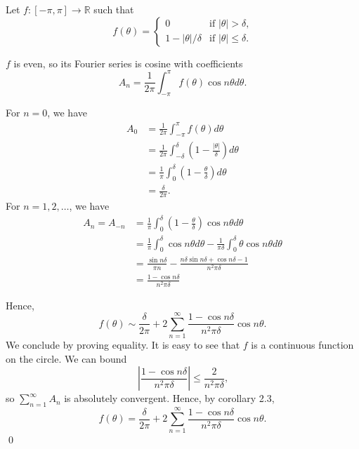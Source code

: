 \documentclass[oneside]{article}
\newcommand\abs[1]{\left|#1\right|}
\newcommand\bbR{\mathbb{R}}
\begin{document}
Let $f : [-\pi, \pi] \to \bbR$ such that \[
  f(\theta) = \begin{cases}
    0 & \text{if }\abs{\theta} > \delta \text{,} \\
    1 - \abs{\theta}/\delta & \text{if }\abs{\theta} \leq \delta \text{.}
  \end{cases}
\]

$f$ is even, so its Fourier series is cosine with coefficients\[
  A_n = \frac{1}{2\pi}\int_{-\pi}^\pi f(\theta)\cos n\theta d\theta \text{.}
\]

For $n = 0$, we have \begin{align*}
  A_0
  &= \frac{1}{2\pi}\int_{-\pi}^\pi f(\theta) d\theta \\
  &= \frac{1}{2\pi}\int_{-\delta}^\delta
  \left(1 - \frac{\abs{\theta}}{\delta}\right) d\theta \\
  &= \frac{1}{\pi}\int_0^\delta
  \left(1 - \frac{\theta}{\delta}\right) d\theta \\
  &= \frac{\delta}{2\pi} \text{.}
\end{align*} For $n = 1, 2, \dots$, we have\begin{align*}
  A_{n} = A_{-n} &= \frac{1}{\pi}\int_0^\delta
  \left(1 - \frac{\theta}{\delta}\right) \cos n\theta d\theta \\
  &= \frac{1}{\pi}\int_0^\delta \cos n\theta d\theta
   - \frac{1}{\pi\delta}\int_0^\delta \theta \cos n\theta d\theta \\
  &= \frac{\sin n\delta}{\pi n}
   - \frac{n\delta\sin n\delta + \cos n\delta - 1}{n^2\pi\delta} \\
  &= \frac{1 - \cos n\delta}{n^2\pi\delta}
\end{align*}

Hence, \[
  f(\theta)
  \sim \frac{\delta}{2\pi}
  + 2\sum_{n=1}^\infty \frac{1 - \cos n\delta}{n^2\pi\delta}\cos n\theta
  \text{.}
\] We conclude by proving equality. It is easy to see that $f$ is a continuous
function on the circle. We can bound \[
  \abs{\frac{1 - \cos n\delta}{n^2 \pi \delta}} \leq \frac{2}{n^2\pi\delta}
  \text{,}
\] so $\sum_{n=1}^\infty A_n$ is absolutely convergent. Hence, by corollary 2.3,
\[
  f(\theta)
  = \frac{\delta}{2\pi}
  + 2\sum_{n=1}^\infty \frac{1 - \cos n\delta}{n^2\pi\delta}\cos n\theta
  \text{.}
\]\qed
\end{document}
